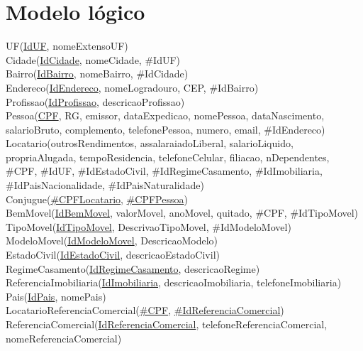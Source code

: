\documentclass{article}
\begin{document}
    \pagebreak
    \section{Modelo lógico}
    
        UF(\underline{IdUF}, nomeExtensoUF)
        \\
        Cidade(\underline{IdCidade}, nomeCidade, \#IdUF)
        \\
        Bairro(\underline{IdBairro}, nomeBairro, \#IdCidade)
        \\
        Endereco(\underline{IdEndereco}, nomeLogradouro, CEP, \#IdBairro)
        \\
        Profissao(\underline{IdProfissao}, descricaoProfissao)
        \\
        Pessoa(\underline{CPF}, RG, emissor, dataExpedicao, nomePessoa, dataNascimento, salarioBruto, complemento, telefonePessoa, numero, email, \#IdEndereco)
        \\
        Locatario(outrosRendimentos, assalaraiadoLiberal, salarioLiquido, propriaAlugada, tempoResidencia, telefoneCelular, filiacao, nDependentes, \#CPF, \#IdUF, \#IdEstadoCivil, \#IdRegimeCasamento, \#IdImobiliaria, \#IdPaisNacionalidade, \#IdPaisNaturalidade)
        \\
        Conjugue(\underline{\#CPFLocatario}, \underline{\#CPFPessoa})
        \\
        BemMovel(\underline{IdBemMovel}, valorMovel, anoMovel, quitado, \#CPF, \#IdTipoMovel)
        \\
        TipoMovel(\underline{IdTipoMovel}, DescrivaoTipoMovel, \#IdModeloMovel)
        \\
        ModeloMovel(\underline{IdModeloMovel}, DescricaoModelo)
        \\
        EstadoCivil(\underline{IdEstadoCivil}, descricaoEstadoCivil)
        \\
        RegimeCasamento(\underline{IdRegimeCasamento}, descricaoRegime)
        \\
        ReferenciaImobiliaria(\underline{IdImobiliaria}, descricaoImobiliaria, telefoneImobiliaria)
        \\
        Pais(\underline{IdPais}, nomePais)
        \\
        LocatarioReferenciaComercial(\underline{\#CPF}, \underline{\#IdReferenciaComercial})
        \\
        ReferenciaComercial(\underline{IdReferenciaComercial}, telefoneReferenciaComercial, nomeReferenciaComercial)
        \\
\end{document}
